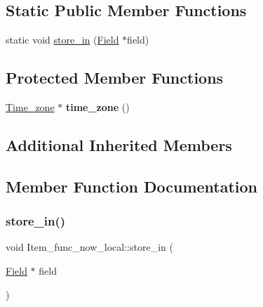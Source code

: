 \subsection*{Static Public Member Functions}
\begin{DoxyCompactItemize}
\item 
static void \mbox{\hyperlink{classItem__func__now__local_a25358fd557efdd4d8f9644e5fbe9eb55}{store\+\_\+in}} (\mbox{\hyperlink{classField}{Field}} $\ast$field)
\end{DoxyCompactItemize}
\subsection*{Protected Member Functions}
\begin{DoxyCompactItemize}
\item 
\mbox{\label{classItem__func__now__local_af1c3ee2caa2b3ce9d2c7eaa9ae0f8442}} 
\mbox{\hyperlink{classTime__zone}{Time\+\_\+zone}} $\ast$ {\bfseries time\+\_\+zone} ()
\end{DoxyCompactItemize}
\subsection*{Additional Inherited Members}


\subsection{Member Function Documentation}
\mbox{\label{classItem__func__now__local_a25358fd557efdd4d8f9644e5fbe9eb55}} 
\subsubsection{\texorpdfstring{store\+\_\+in()}{store\_in()}}
{\footnotesize\ttfamily void Item\+\_\+func\+\_\+now\+\_\+local\+::store\+\_\+in (\begin{DoxyParamCaption}\item[{\mbox{\hyperlink{classField}{Field}} $\ast$}]{field }\end{DoxyParamCaption})\hspace{0.3cm}{\ttfamily [static]}}

